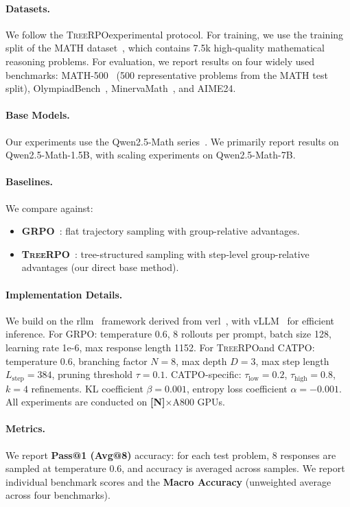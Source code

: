 \documentclass{article} %
\newcommand{\CATPO}{\textsc{CATPO}}
\newcommand{\TreeRPO}{\textsc{TreeRPO}}
\newcommand{\placeholder}[1]{{\color{red}\textbf{[#1]}}}
\begin{document}
\paragraph{Datasets.} We follow the \TreeRPO experimental protocol. For training, we use the training split of the MATH dataset~\citep{hendrycksmath2021}, which contains 7.5k high-quality mathematical reasoning problems. For evaluation, we report results on four widely used benchmarks: MATH-500~\citep{verify_stepbystep} (500 representative problems from the MATH test split), OlympiadBench~\citep{olympiadbench}, MinervaMath~\citep{minerva}, and AIME24.

\paragraph{Base Models.} Our experiments use the Qwen2.5-Math series~\citep{qwen25math}. We primarily report results on Qwen2.5-Math-1.5B, with scaling experiments on Qwen2.5-Math-7B.

\paragraph{Baselines.} We compare against:
\begin{itemize}
    \item \textbf{GRPO}~\citep{deepseekmathgrpo}: flat trajectory sampling with group-relative advantages.
    \item \textbf{\TreeRPO}~\citep{treerpo}: tree-structured sampling with step-level group-relative advantages (our direct base method).
\end{itemize}

\paragraph{Implementation Details.} We build on the rllm~\citep{deepcoder2025,deepscaler2025} framework derived from verl~\citep{verl}, with vLLM~\citep{vllm} for efficient inference. For GRPO: temperature 0.6, 8 rollouts per prompt, batch size 128, learning rate 1e-6, max response length 1152. For \TreeRPO and \CATPO: temperature 0.6, branching factor $N=8$, max depth $D=3$, max step length $L_\text{step}=384$, pruning threshold $\tau=0.1$. \CATPO-specific: $\tau_\text{low}=0.2$, $\tau_\text{high}=0.8$, $k=4$ refinements. KL coefficient $\beta=0.001$, entropy loss coefficient $\alpha=-0.001$. All experiments are conducted on \placeholder{N}$\times$A800 GPUs.

\paragraph{Metrics.} We report \textbf{Pass@1 (Avg@8)} accuracy: for each test problem, 8 responses are sampled at temperature 0.6, and accuracy is averaged across samples. We report individual benchmark scores and the \textbf{Macro Accuracy} (unweighted average across four benchmarks).
\end{document}
